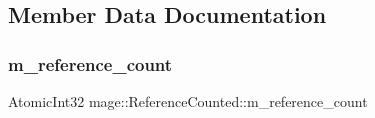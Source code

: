 \subsection{Member Data Documentation}
\hypertarget{classmage_1_1_reference_counted_a8ff45f2437be26148d0efcd271adaf45}{}\label{classmage_1_1_reference_counted_a8ff45f2437be26148d0efcd271adaf45} 
\subsubsection{\texorpdfstring{m\+\_\+reference\+\_\+count}{m\_reference\_count}}
{\footnotesize\ttfamily Atomic\+Int32 mage\+::\+Reference\+Counted\+::m\+\_\+reference\+\_\+count}

